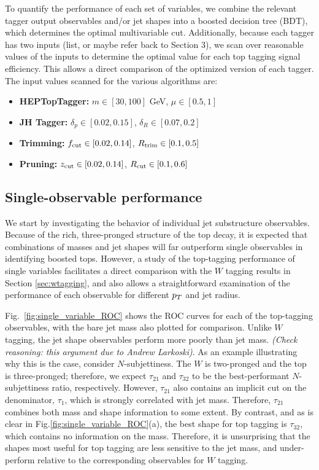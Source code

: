 To quantify the performance of each set of variables, we combine the relevant tagger output observables and/or jet shapes into a boosted decision tree (BDT), which determines the optimal multivariable cut. Additionally, because each tagger has two inputs (list, or maybe refer back to Section 3), we scan over reasonable values of the inputs to determine the optimal value for each top tagging signal efficiency. This allows  a direct comparison of the optimized version of each tagger. The input values scanned for the various algorithms are:
%
\begin{itemize}
\item {\bf HEPTopTagger:} $m\in[30,100]$ GeV, $\mu\in[0.5,1]$
\item {\bf JH Tagger:} $\delta_p\in[0.02,0.15]$, $\delta_R\in[0.07,0.2]$
\item {\bf Trimming:} $f_{\rm cut}\in[0.02,0.14]$, $R_{\rm trim}\in[0.1,0.5]$
\item {\bf Pruning:} $z_{\rm cut}\in[0.02,0.14]$, $R_{\rm cut}\in[0.1,0.6]$
\end{itemize}

\subsection{Single-observable performance}
We start by investigating the behavior of individual jet substructure observables. Because of the rich, three-pronged structure of the top decay, it is expected that combinations of masses and jet shapes will far outperform single observables in identifying boosted tops. However, a study of the top-tagging performance of single variables facilitates a direct comparison with the $W$ tagging results in Section \ref{sec:wtagging}, and also allows a straightforward examination of the performance of each observable for different $p_T$ and jet radius.

Fig.~\ref{fig:single_variable_ROC} shows the ROC curves for each of the top-tagging observables, with the bare jet mass also plotted for comparison. Unlike $W$ tagging, the jet shape observables perform more poorly than jet mass. \emph{(Check reasoning: this argument due to Andrew Larkoski)}. As an example illustrating why this is the case, consider $N$-subjettiness. The $W$ is two-pronged and the top is three-pronged; therefore, we expect $\tau_{21}$ and $\tau_{32}$ to be the best-performant $N$-subjettiness ratio, respectively. However, $\tau_{21}$ also contains an implicit cut on the denominator, $\tau_1$, which is strongly correlated with jet mass. Therefore, $\tau_{21}$ combines both mass and shape information to some extent. By contrast, and as is clear in Fig.\ref{fig:single_variable_ROC}(a), the best shape for top tagging is $\tau_{32}$, which contains no information on the mass. Therefore, it is  unsurprising that the  shapes most useful for top tagging are less sensitive to the jet mass, and under-perform relative to the corresponding observables for $W$ tagging.

